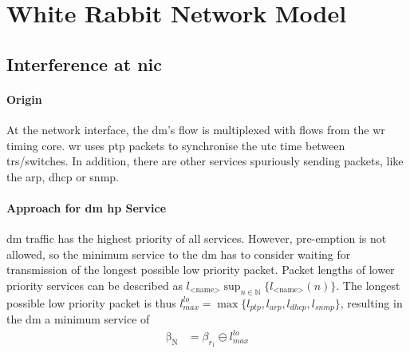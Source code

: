 \section{White Rabbit Network Model}

\subsection{Interference at \gls{nic}}
\paragraph{Origin} At the network interface, the \gls{dm}'s flow is multiplexed with flows from the \gls{wr} timing core. \gls{wr} uses \gls{ptp} packets to synchronise the
\gls{utc} time between \gls{tr}s/switches. In addition, there are other services spuriously sending packets, like the \gls{arp},
\gls{dhcp} or \gls{snmp}.

\paragraph{Approach for \gls{dm} \gls{hp} Service}
\gls{dm} traffic has the highest priority of all services. However, pre-emption is not allowed, so the minimum service to the \gls{dm} has to consider waiting for transmission of the longest possible low priority packet.
Packet lengths of lower priority services can be described as $l_{\text{<name>}}\sup_{n\in \mathbb{N}}\{l_{\text{<name>}}(n)\}$.
The longest possible low priority packet is thus $l^{lo}_{max} = \max\{l_{ptp}, l_{arp}, l_{dhcp}, l_{snmp}\}$, resulting in the \gls{dm} a minimum service of
\begin{equation}
\begin{aligned}
\mathrm{\beta_{N}} &= \beta_{r_1} \ominus l^{lo}_{max}
\label{eq:wr-nic}
\end{aligned}
\end{equation}

